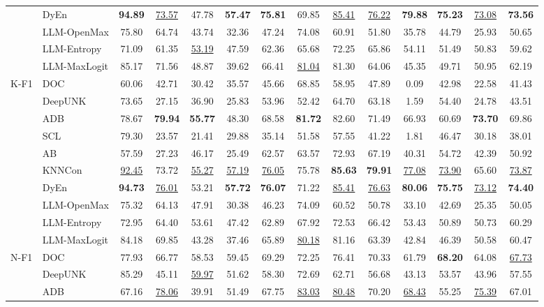 \begin{tabular}{llcccccccccccc}
&DyEn&\textbf{94.89}&\underline{73.57}&47.78&\textbf{57.47}&\textbf{75.81}&69.85&\underline{85.41}&\underline{76.22}&\textbf{79.88}&\textbf{75.23}&\underline{73.08}&\textbf{73.56}\\
&LLM-OpenMax&75.80&64.74&43.74&32.36&47.24&74.08&60.91&51.80&35.78&44.79&25.93&50.65\\
&LLM-Entropy&71.09&61.35&\underline{53.19}&47.59&62.36&65.68&72.25&65.86&54.11&51.49&50.83&59.62\\
&LLM-MaxLogit&85.17&71.56&48.87&39.62&66.41&\underline{81.04}&81.30&64.06&45.35&49.71&50.95&62.19\\
\cline{1-14}
\multirow[t]{10}{*}{K-F1}&DOC&60.06&42.71&30.42&35.57&45.66&68.85&58.95&47.89&0.09&42.98&22.58&41.43\\
&DeepUNK&73.65&27.15&36.90&25.83&53.96&52.42&64.70&63.18&1.59&54.40&24.78&43.51\\
&ADB&78.67&\textbf{79.94}&\textbf{55.77}&48.30&68.58&\textbf{81.72}&82.60&71.49&66.93&60.69&\textbf{73.70}&69.86\\
&SCL&79.30&23.57&21.41&29.88&35.14&51.58&57.55&41.22&1.81&46.47&30.18&38.01\\
&AB&57.59&27.23&46.17&25.49&62.57&63.57&72.93&67.19&40.31&54.72&42.39&50.92\\
&KNNCon&\underline{92.45}&73.72&\underline{55.27}&\underline{57.19}&\underline{76.05}&75.78&\textbf{85.63}&\textbf{79.91}&\underline{77.08}&\underline{73.90}&65.60&\underline{73.87}\\
&DyEn&\textbf{94.73}&\underline{76.01}&53.21&\textbf{57.72}&\textbf{76.07}&71.22&\underline{85.41}&\underline{76.63}&\textbf{80.06}&\textbf{75.75}&\underline{73.12}&\textbf{74.40}\\
&LLM-OpenMax&75.32&64.13&47.91&30.38&46.23&74.09&60.52&50.78&33.10&42.69&25.35&50.05\\
&LLM-Entropy&72.95&64.40&53.61&47.42&62.89&67.92&72.53&66.42&53.43&50.89&50.73&60.29\\
&LLM-MaxLogit&84.18&69.85&43.28&37.46&65.89&\underline{80.18}&81.16&63.39&42.84&46.39&50.58&60.47\\
\cline{1-14}
\multirow[t]{10}{*}{N-F1}&DOC&77.93&66.77&58.53&59.45&69.29&72.25&76.41&70.33&61.79&\textbf{68.20}&64.08&\underline{67.73}\\
&DeepUNK&85.29&45.11&\underline{59.97}&51.62&58.30&72.69&62.71&56.68&43.13&53.57&43.96&57.55\\
&ADB&67.16&\underline{78.06}&39.91&51.49&67.75&\underline{83.03}&\underline{80.48}&70.20&\underline{68.43}&55.25&\underline{75.39}&67.01\\

\end{tabular}
